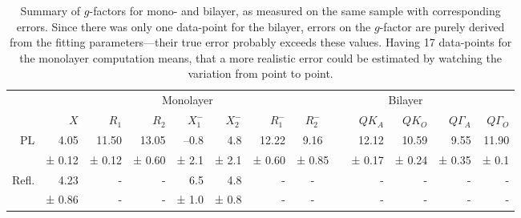 \begin{table}[t]
	\centering
	\begin{tabular}{@{}rrrrrrrcrrrrr@{}}
		\toprule
	& \multicolumn{7}{c}{Monolayer} & \multicolumn{4}{c}{Bilayer}\\
	\cmidrule{2-8} \cmidrule{10-13}
	 & $X$ & $R_1$ & $R_2$ & $X^-_1$ & $X^-_2$ & $R^-_1$ & $R^-_2$ && $QK_A$ & $QK_O$ & $Q\Gamma_A$ & $Q\Gamma_O$\\ \midrule
	PL & 4.05& 11.50& 13.05 & --0.8& 4.8 & 12.22  & 9.16 && 12.12 & 10.59 & 9.55  & 11.90  \\
	& ± 0.12 &  ± 0.12 & ± 0.60 &  ± 2.1 &  ± 2.1 & ± 0.60  & ± 0.85 &&  ± 0.17 & ± 0.24 & ± 0.35 & ± 0.1 \\
	Refl. & 4.23 & - & - & 6.5 & 4.8 & - & - && - & - & - & - \\
	& ± 0.86 & - & - & ± 1.0 & ± 0.8 & - & - && - & - & - & - \\ \bottomrule

	\end{tabular}
	\caption{Summary of $g$-factors for \wse mono- and bilayer, as measured on the same sample with corresponding errors. Since there was only one data-point for the bilayer, errors on the $g$-factor are purely derived from the fitting parameters---their true error probably exceeds these values. Having 17 data-points for the monolayer computation means, that a more realistic error could be estimated by watching the variation from point to point.}\label{horsepoop}
\end{table}

